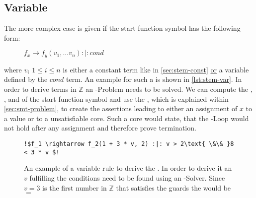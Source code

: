 \subsection{Variable \stem}
\label{sec:stem-var}
The more complex case is given if the start function symbol has the following form:
\begin{figure}[H]
	\hspace{2cm}
	$f_x \rightarrow f_y(v_1, \dots v_n) :|: cond$
\end{figure}
where $v_i$ $1 \le i \le n$ is either a constant term like in \autoref{sec:stem-const} \underline{or} a variable defined by the $cond$ term. An example for such a \stem is shown in \autoref{lst:stem-var}. In order to derive terms in $\mathbb{Z}$ an -Problem needs to be solved. We can compute the \guardmatrix, \guardconstants, \updatematrix and \updateconstants of the start function symbol and use the \smtfactory, which is explained within \autoref{sec:smt-problem}, to create the assertions leading to either an assignment of $x$ to a value or to a unsatisfiable core. Such a core would state, that the -Loop would not hold after any assignment and therefore prove termination.

\newsavebox{\stemextwo}%
\newsavebox{\stemextwosecond}%
\begin{figure}[H]
	\begin{lstlisting}[escapechar=!]
	!$f_1 \rightarrow f_2(1 + 3 * v, 2) :|: v > 2\text{ \&\& }8 < 3 * v $!
	\end{lstlisting}	
	\caption{An example of a variable \its rule to derive the \stem. In order to derive it an $v$ fulfilling the conditions need to be found using an -Solver. Since $v=3$ is the first number in $\mathbb{Z}$ that satisfies the guards the \stem would be \usebox{\stemextwo}$=$\usebox{\stemextwosecond} }
	\label{lst:stem-var}
\end{figure}

